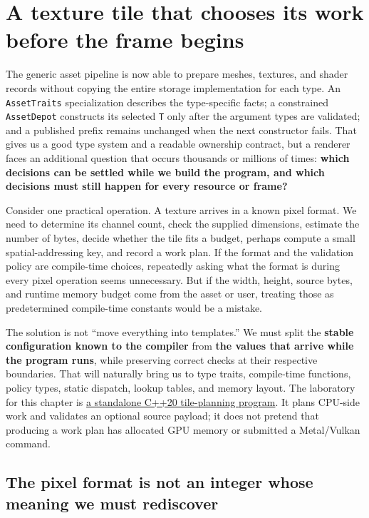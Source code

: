 \section{A texture tile that chooses its work before the frame begins}\label{01-foundations-i-ch005-a-texture-tile-that-chooses-its-work-before-the-frame-begins}

The generic asset pipeline is now able to prepare meshes, textures, and shader records without copying the entire storage implementation for each type. An \texttt{AssetTraits} specialization describes the type-specific facts; a constrained \texttt{AssetDepot} constructs its selected \texttt{T} only after the argument types are validated; and a published prefix remains unchanged when the next constructor fails. That gives us a good type system and a readable ownership contract, but a renderer faces an additional question that occurs thousands or millions of times: \textbf{which decisions can be settled while we build the program, and which decisions must still happen for every resource or frame?}

Consider one practical operation. A texture arrives in a known pixel format. We need to determine its channel count, check the supplied dimensions, estimate the number of bytes, decide whether the tile fits a budget, perhaps compute a small spatial-addressing key, and record a work plan. If the format and the validation policy are compile-time choices, repeatedly asking what the format is during every pixel operation seems unnecessary. But if the width, height, source bytes, and runtime memory budget come from the asset or user, treating those as predetermined compile-time constants would be a mistake.

The solution is not ``move everything into templates.'' We must split the \textbf{stable configuration known to the compiler} from \textbf{the values that arrive while the program runs}, while preserving correct checks at their respective boundaries. That will naturally bring us to type traits, compile-time functions, policy types, static dispatch, lookup tables, and memory layout. The laboratory for this chapter is \hyperref[source-file-f5eb017280bb6b2ae6b1475d]{a standalone C++20 tile-planning program}. It plans CPU-side work and validates an optional source payload; it does not pretend that producing a work plan has allocated GPU memory or submitted a Metal/Vulkan command.

\subsection{The pixel format is not an integer whose meaning we must rediscover}\label{01-foundations-i-ch005-the-pixel-format-is-not-an-integer-whose-meaning-we-must-rediscover}

